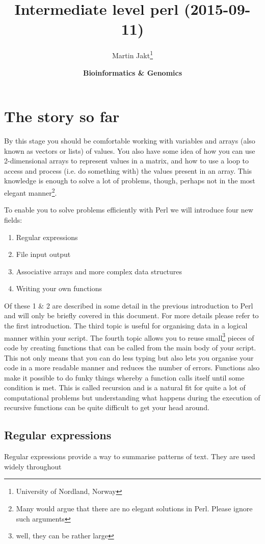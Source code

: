 \documentclass[11pt]{article}
\author{Martin Jakt\thanks{University of Nordland, Norway}}
\date{\textbf{Bioinformatics \& Genomics}}
\title{\textbf{Intermediate level perl} (2015-09-11)}
\begin{document}
\maketitle

\section{The story so far}
\label{sec-1}
By this stage you should be comfortable working with variables and arrays (also
known as vectors or lists) of values. You also have some idea of how you can
use 2-dimensional arrays to represent values in a matrix, and how to use a loop
to access and process (i.e. do something with) the values present in an array.
This knowledge is enough to solve a lot of problems, though, perhaps not in
the most elegant manner\footnote{Many would argue that there are no elegant solutions
in Perl. Please ignore such arguments}.

To enable you to solve problems efficiently with Perl we will introduce four new fields:
\begin{enumerate}
\item Regular expressions
\item File input output
\item Associative arrays and more complex data structures
\item Writing your own functions
\end{enumerate}

Of these 1 \& 2 are described in some detail in the previous introduction to Perl
and will only be briefly covered in this document. For more details please refer
to the first introduction. The third topic is useful for organising data in a
logical manner within your script. The fourth topic allows you to reuse 
small\footnote{well, they can be rather large} pieces of code by creating functions
that can be called from the main body of your script. This not only means
that you can do less typing but also lets you organise your code in a more readable
manner and reduces the number of errors. Functions also make it possible to do
funky things whereby a function calls itself until some condition is met. This is
called recursion and is a natural fit for quite a lot of computational problems but
understanding what happens during the execution of recursive functions can be
quite difficult to get your head around.

\subsection{Regular expressions}
\label{sec-1-1}
Regular expressions provide a way to summarise patterns of text. They are used widely
throughout 
\end{document}
